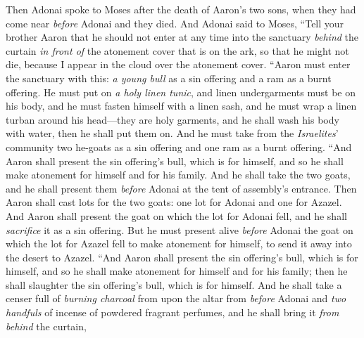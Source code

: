 \begin{biblechapter} %
 Then Adonai spoke to Moses after the death of Aaron’s two sons, when they had come near \textit{before} Adonai and they died.
\verse And Adonai said to Moses, “Tell your brother Aaron that he should not enter at any time into the sanctuary \textit{behind} the curtain \textit{in front of} the atonement cover that is on the ark, so that he might not die, because I appear in the cloud over the atonement cover.
\verse “Aaron must enter the sanctuary with this: \textit{a young bull} as a sin offering and a ram as a burnt offering.
\verse He must put on \textit{a holy linen tunic}, and linen undergarments must be on his body, and he must fasten himself with a linen sash, and he must wrap a linen turban around his head—they are holy garments, and he shall wash his body with water, then he shall put them on.
\verse And he must take from the \textit{Israelites}’ community two he-goats as a sin offering and one ram as a burnt offering.
\verse “And Aaron shall present the sin offering’s bull, which is for himself, and so he shall make atonement for himself and for his family.
\verse And he shall take the two goats, and he shall present them \textit{before} Adonai at the tent of assembly’s entrance.
\verse Then Aaron shall cast lots for the two goats: one lot for Adonai and one for Azazel.
\verse And Aaron shall present the goat on which the lot for Adonai fell, and he shall \textit{sacrifice} it as a sin offering.
\verse But he must present alive \textit{before} Adonai the goat on which the lot for Azazel fell to make atonement for himself, to send it away into the desert to Azazel.
\verse “And Aaron shall present the sin offering’s bull, which is for himself, and so he shall make atonement for himself and for his family; then he shall slaughter the sin offering’s bull, which is for himself.
\verse And he shall take a censer full of \textit{burning charcoal} from upon the altar from \textit{before} Adonai and \textit{two handfuls} of incense of powdered fragrant perfumes, and he shall bring it \textit{from behind} the curtain,

\end{biblechapter}
